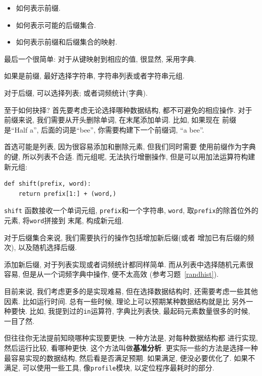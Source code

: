 \documentclass[10pt]{book}
\begin{document}
\begin{itemize}

\item 如何表示前缀.

\item 如何表示可能的后缀集合.

\item 如何表示前缀和后缀集合的映射.

\end{itemize}

最后一个很简单: 对于从键映射到相应的值, 很显然, 采用字典. 

如果是前缀, 最好选择字符串, 字符串列表或者字符串元组. 

对于后缀, 可以选择列表; 或者词频统计(字典).

至于如何抉择? 首先要考虑无论选择哪种数据结构, 都不可避免的相应操作. 
对于前缀来说, 我们需要从开头删除单词, 在末尾添加单词. 比如, 如果现在
前缀是``Half a'', 后面的词是``bee'',  你需要构建下一个前缀词, ``a bee''. 

首选可能是列表, 因为很容易添加和删除元素, 但我们同时需要
使用前缀作为字典的键, 所以列表不合适. 
而元组呢, 无法执行增删操作, 
但是可以用加法运算符构建新元组:

\begin{verbatim}
def shift(prefix, word):
    return prefix[1:] + (word,)
\end{verbatim}
%

{\tt shift} 函数接收一个单词元组, {\tt prefix}和一个字符串, 
{\tt word}, 取{\tt prefix}的除首位外的元素, 将{\tt word}拼接到
末尾, 构成新元组. 

对于后缀集合来说, 我们需要执行的操作包括增加新后缀(或者
增加已有后缀的频次), 以及随机选择后缀. 

添加新后缀, 对于列表实现或者词频统计都同样简单. 
而从列表中选择随机元素很容易, 但是从一个词频字典中操作, 便不太高效
(参考习题~\ref{randhist}). 

目前来说, 我们考虑更多的是实现难易, 
但在选择数据结构时, 还需要考虑一些其他因素. 
比如运行时间. 总有一些时候, 理论上可以预期某种数据结构就是比
另外一种要快. 比如, 我提到过的{\tt in}运算符, 字典比列表快, 
最起码元素数量很多的时候, 一目了然. 

但往往你无法提前知晓哪种实现要更快. 一种方法是, 对每种数据结构都
进行实现, 然后运行比较, 看哪种更快. 这个方法叫做{\bf 基准分析}.
更实际一些的方法是选择一种最容易实现的数据结构, 
然后看是否满足预期. 如果满足, 便没必要优化了. 如果不满足, 
可以使用一些工具, 像{\tt profile}模块, 以定位程序最耗时的部分. 
\end{document}
